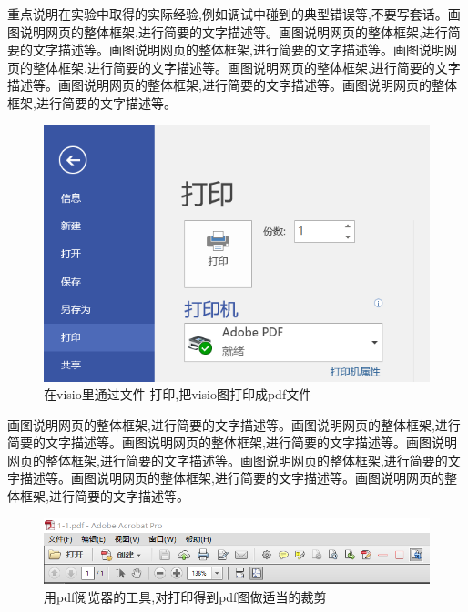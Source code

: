 \documentclass[supercite]{Experimental_Report}
\theoremstyle{definition}
\begin{document}
重点说明在实验中取得的实际经验,例如调试中碰到的典型错误等,不要写套话。画图说明网页的整体框架,进行简要的文字描述等。画图说明网页的整体框架,进行简要的文字描述等。画图说明网页的整体框架,进行简要的文字描述等。画图说明网页的整体框架,进行简要的文字描述等。画图说明网页的整体框架,进行简要的文字描述等。画图说明网页的整体框架,进行简要的文字描述等。画图说明网页的整体框架,进行简要的文字描述等。

\begin{figure}[htb]
	\begin{center}
		\includegraphics[scale=0.60]{images/1-2.png}
		\caption{在visio里通过文件-打印,把visio图打印成pdf文件}
		\label{fig1-2}
		\end{center}
\end{figure}

画图说明网页的整体框架,进行简要的文字描述等。画图说明网页的整体框架,进行简要的文字描述等。画图说明网页的整体框架,进行简要的文字描述等。画图说明网页的整体框架,进行简要的文字描述等。画图说明网页的整体框架,进行简要的文字描述等。画图说明网页的整体框架,进行简要的文字描述等。画图说明网页的整体框架,进行简要的文字描述等。

\begin{figure}[htb]
	\begin{center}
		\includegraphics[scale=0.50]{images/1-3.png}
		\caption{用pdf阅览器的工具,对打印得到pdf图做适当的裁剪}
		\label{fig1-3}
	\end{center}
\end{figure}
\end{document}
